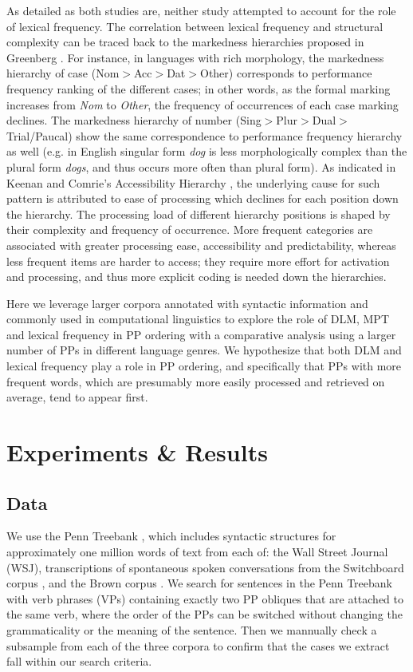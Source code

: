 \documentclass[11pt,letterpaper]{article}
\begin{document}
As detailed as both studies are, neither study attempted to account for the role of lexical frequency. The correlation between lexical frequency and structural complexity can be traced back to the markedness hierarchies proposed in Greenberg . For instance, in languages with rich morphology, the markedness hierarchy of case (Nom$>$Acc$>$Dat$>$Other) corresponds to performance frequency ranking of the different cases; in other words, as the formal marking increases from \textit{Nom} to \textit{Other}, the frequency of occurrences of each case marking declines. The markedness hierarchy of number (Sing$>$Plur$>$Dual$>$Trial/Paucal) show the same correspondence to performance frequency hierarchy as well (e.g. in English singular form \textit{dog} is less morphologically complex than the plural form \textit{dogs}, and thus occurs more often than plural form). As indicated in Keenan and Comrie’s Accessibility Hierarchy , the underlying cause for such pattern is attributed to ease of processing which declines for each position down the hierarchy. The processing load of different hierarchy positions is shaped by their complexity and frequency of occurrence. More frequent categories are associated with greater processing ease, accessibility and predictability, whereas less frequent items are harder to access; they require more effort for activation and processing, and thus more explicit coding is needed down the hierarchies. 

Here we leverage larger corpora annotated with syntactic information and commonly used in computational linguistics to explore the role of DLM, MPT and lexical frequency in PP ordering with a comparative analysis using a larger number of PPs in different language genres. We hypothesize that both DLM and lexical frequency play a role in PP ordering, and specifically that PPs with more frequent words, which are presumably more easily processed and retrieved on average, tend to appear first. 

\section{Experiments \& Results}

\subsection{Data}

We use the Penn Treebank \cite{marcus1993building}, which includes syntactic structures for approximately one million words of text from each of: the Wall Street Journal (WSJ), transcriptions of spontaneous spoken conversations from the Switchboard corpus \cite{godfrey1992switchboard}, and the Brown corpus \cite{kuvcera1967computational}. We search for sentences in the Penn Treebank with verb phrases (VPs) containing exactly two PP obliques that are attached to the same verb, where the order of the PPs can be switched without changing the grammaticality or the meaning of the sentence. Then we mannually check a subsample from each of the three corpora to confirm that the cases we extract fall within our search criteria.
\end{document}
